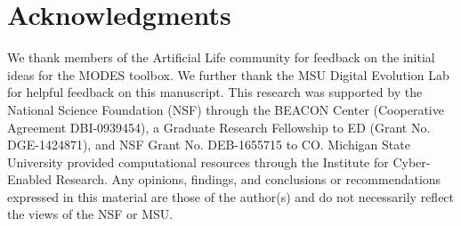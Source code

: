 \documentclass[letterpaper]{article}
\providecommand{\DIFaddbegin}{} %
\providecommand{\DIFaddend}{} %
\providecommand{\DIFdelbegin}{} %
\providecommand{\DIFdelend}{} %
\begin{document}
\section{Acknowledgments}
We thank members of the Artificial Life community for feedback on the initial ideas for the MODES toolbox.  We further thank the MSU Digital Evolution Lab for helpful feedback on this manuscript. This research was supported by the National Science Foundation (NSF) through the BEACON Center (Cooperative Agreement DBI-0939454), a Graduate Research Fellowship to ED (Grant No. DGE-1424871), and NSF Grant No. DEB-1655715 to CO. Michigan State University provided computational resources through the Institute for Cyber-Enabled Research. Any opinions, findings, and conclusions or recommendations expressed in this material are those of the author(s) and do not necessarily reflect the views of the NSF or MSU.

\DIFdelbegin %
\DIFdelend \DIFaddbegin 

\DIFaddend 
\end{document}

